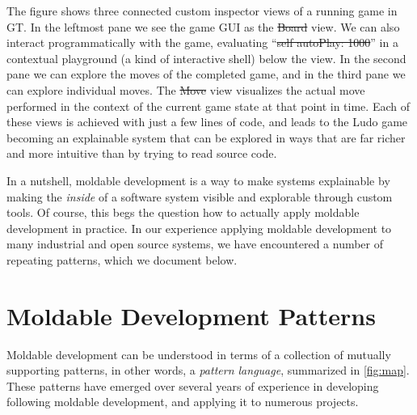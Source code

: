 \documentclass[acmsmall,screen,authorversion,nonacm]{acmart} %
\newcommand\rb[1]{\nbc{Ralf}{#1}{teal}}
\newcommand\cp[1]{\nbe{Cesare}{#1}{olive}} %
\newcommand\dd[1]{\nbe{Daniel}{#1}{magenta}} %
\newcommand{\GT}{\lst{GT}\xspace} %
\begin{document}
The figure shows three connected custom inspector views
of a running game in GT.
In the leftmost pane we see the game GUI as the \st{Board} view.
We can also interact programmatically with the game, evaluating ``\st{self autoPlay: 1000}'' in a contextual playground (a kind of interactive shell) below the view.
In the second pane we can explore the moves of  the completed game, and in the third pane we can explore individual moves.
The \st{Move} view visualizes the actual move performed in the context of the current game state at that point in time.
Each of these views is achieved with just a few lines of code, and leads to the Ludo game becoming an explainable system that can be explored in ways that are far richer and more intuitive than by trying to read source code.

In a nutshell, moldable development is a way to make systems explainable by making the \emph{inside} of a software system visible and explorable through custom tools.
Of course, this begs the question how to actually apply moldable development in practice.
In our experience applying moldable development to many industrial and open source systems, we have encountered a number of repeating patterns, which we document below.

\section{Moldable Development Patterns}



Moldable development can be understood in terms of a collection of mutually supporting 
patterns, in other words, a \emph{pattern language}, summarized in \autoref{fig:map}.
These patterns have emerged over several years of experience in developing \GT following moldable development, and applying it to numerous projects.
\end{document}
